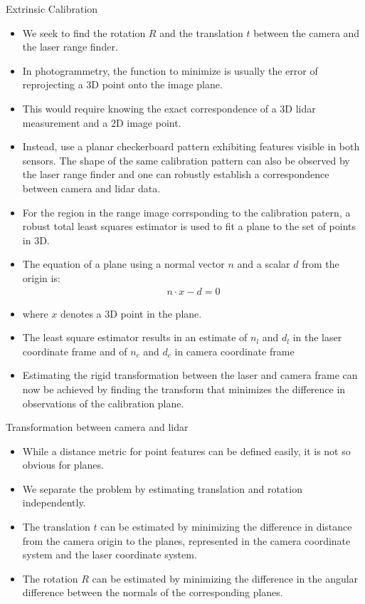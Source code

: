 \documentclass[10pt,mathserif]{beamer}
\begin{document}
\begin{frame}{Extrinsic Calibration}
\begin{itemize}
\item We seek to find the rotation $R$ and the translation $t$ between the camera and the laser range
finder.
\item In photogrammetry, the function to minimize is usually the error of reprojecting a 3D point onto
the image plane.
\item This would require knowing the exact correspondence of a 3D lidar measurement and a 2D image point.
\item Instead, use a planar checkerboard pattern exhibiting features visible in both sensors. 
The shape of the same calibration pattern can also be observed by the laser range finder and one can 
robustly establish a correspondence between camera and lidar data.
\end{itemize}
\end{frame}

\begin{frame}
\begin{itemize}
\item For the region in the range image corrsponding to the calibration patern, a robust total least
squares estimator is used to fit a plane to the set of points in 3D.
\item The equation of a plane using a normal vector $n$ and a scalar $d$ from the origin is:
\begin{align}
n\cdot x - d = 0
\end{align}
\item where $x$ denotes a 3D point in the plane.
\item The least square estimator results in an estimate of $n_l$ and $d_l$ in the laser coordinate 
frame and of $n_c$ and $d_c$ in camera coordinate frame 
\item Estimating the rigid transformation between the laser and camera frame can now be achieved by
finding the transform that minimizes the difference in observations of the calibration plane.
\end{itemize}
\end{frame}

\begin{frame}{Transformation between camera and lidar}
\begin{itemize}
\item While a distance metric for point features can be defined easily, it is not so obvious for planes.
\item We separate the problem by estimating translation and rotation independently.
\item The translation $t$ can be estimated by minimizing the difference in distance from the camera origin to the planes, represented in the camera coordinate system and the laser coordinate system.
\item The rotation $R$ can be estimated by minimizing the difference in the angular difference between
the normals of the corresponding planes.
\end{itemize}
\end{frame}
\end{document}
